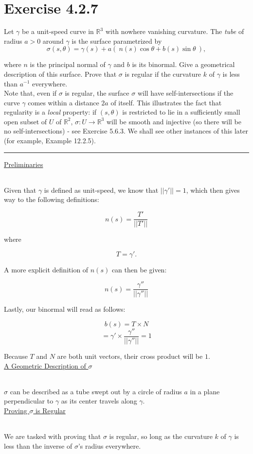 \documentclass[12pt]{article}
\newcommand{\ulind}[1]
{
\noindent
\underline{#1}\\\\
\indent
}
\newcommand{\norm}[1]
{
||#1||
}
\begin{document}
\maketitle

\section*{Exercise 4.2.7}
\indent

Let $\gamma$ be a unit-speed curve in $\mathbb{R}^3$ with nowhere vanishing curvature. The \emph{tube} of radius $a > 0$ around $\gamma$ is the surface parametrized by
$$
\sigma(s,\theta) = \gamma(s) + a( \ n(s)\cos \theta + b(s) \sin \theta \ ),
$$

where $n$ is the principal normal of $\gamma$ and $b$ is its binormal. Give a geometrical description of this surface. Prove that $\sigma$ is regular if the curvature $k$ of $\gamma$ is less than $a^{-1}$ everywhere.\\

Note that, even if $\sigma$ is regular, the surface $\sigma$ will have self-intersections if the curve $\gamma$ comes within a distance $2a$ of itself. This illustrates the fact that regularity is a \emph{local} property: if $(s,\theta)$ is restricted to lie in a sufficiently small open subset of $U$ of $\mathbb{R}^2$, $\sigma : U \rightarrow \mathbb{R}^3$ will be smooth and injective (so there will be no self-intersections) - see Exercise 5.6.3. We shall see other instances of this later (for example, Example 12.2.5).

\vspace{1cm}
\hrule
\vspace{1cm}
\noindent

\ulind{Preliminaries}
Given that $\gamma$ is defined as unit-speed, we know that $\norm{\gamma'} = 1$, which then gives way to the following definitions:

$$
n(s) = \frac{T'}{\norm{T'}}
$$

where

$$
T = \gamma'.
$$

A more explicit definition of $n(s)$ can then be given:

$$
n(s) = \frac{\gamma''}{\norm{\gamma''}}
$$

\clearpage

Lastly, our binormal will read as follows:

$$
b(s) = T \times N
$$
$$
= \gamma' \times \frac{\gamma''}{\norm{\gamma''}} = 1
$$

Because $T$ and $N$ are both unit vectors, their cross product will be $1$.\\

\ulind{A Geometric Description of $\sigma$}
$\sigma$ can be described as a tube swept out by a circle of radius $a$ in a plane perpendicular to $\gamma$ as its center travels along $\gamma$. \\

\ulind{Proving $\sigma$ is Regular}
We are tasked with proving that $\sigma$ is regular, so long as the curvature $k$ of $\gamma$ is less than the inverse of $\sigma$'s radius everywhere.
\end{document}
